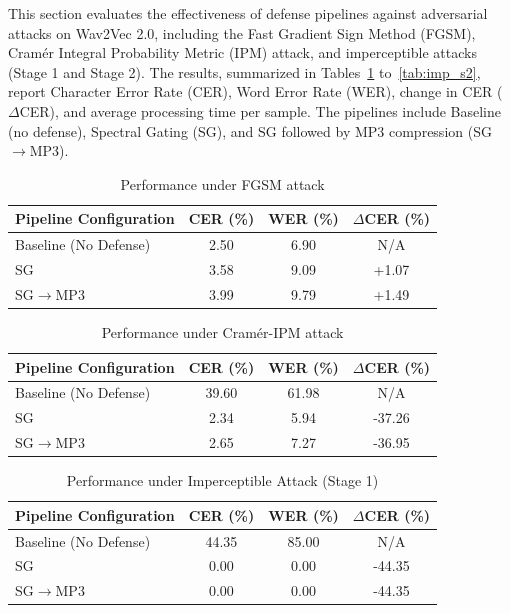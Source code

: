 \documentclass[../main.tex]{subfiles}
\begin{document}
This section evaluates the effectiveness of defense pipelines against adversarial attacks on Wav2Vec 2.0, including the Fast Gradient Sign Method (FGSM), Cramér Integral Probability Metric (IPM) attack, and imperceptible attacks (Stage 1 and Stage 2). The results, summarized in Tables~\ref{tab:fgsm} to~\ref{tab:imp_s2}, report Character Error Rate (CER), Word Error Rate (WER), change in CER ($\Delta$CER), and average processing time per sample. The pipelines include Baseline (no defense), Spectral Gating (SG), and SG followed by MP3 compression (SG$\to$MP3).

\begin{table}[H]
\centering
\caption{Performance under FGSM attack}
\label{tab:fgsm}
\begin{tabular}{lccc}
\toprule
Pipeline Configuration & CER (\%) & WER (\%) & $\Delta$CER (\%) \\
\midrule
Baseline (No Defense) & 2.50 & 6.90 & N/A \\
SG & 3.58 & 9.09 & +1.07 \\
SG$\to$MP3 & 3.99 & 9.79 & +1.49 \\
\bottomrule
\end{tabular}
\end{table}

\begin{table}[H]
\centering
\caption{Performance under Cramér-IPM attack}
\label{tab:cramer}
\begin{tabular}{lccc}
\toprule
Pipeline Configuration & CER (\%) & WER (\%) & $\Delta$CER (\%) \\
\midrule
Baseline (No Defense) & 39.60 & 61.98 & N/A \\
SG & 2.34 & 5.94 & -37.26 \\
SG$\to$MP3 & 2.65 & 7.27 & -36.95 \\
\bottomrule
\end{tabular}
\end{table}

\begin{table}[H]
\centering
\caption{Performance under Imperceptible Attack (Stage 1)}
\label{tab:imp_s1}
\begin{tabular}{lccc}
\toprule
Pipeline Configuration & CER (\%) & WER (\%) & $\Delta$CER (\%) \\
\midrule
Baseline (No Defense) & 44.35 & 85.00 & N/A \\
SG & 0.00 & 0.00 & -44.35 \\
SG$\to$MP3 & 0.00 & 0.00 & -44.35 \\
\bottomrule
\end{tabular}
\end{table}
\end{document}
